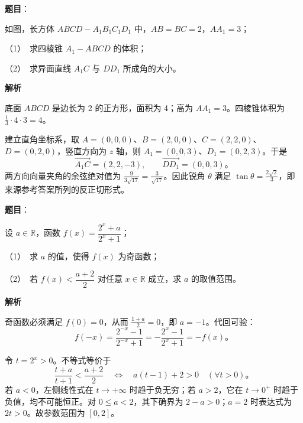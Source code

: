 \begin{answer}

\textbf{题目}：

如图，长方体 $ABCD-A_1B_1C_1D_1$ 中，$AB=BC=2$，$AA_1=3$；
\nopagebreak[4]
\begin{center}\end{center}
\nopagebreak[4]
（1）　求四棱锥 $A_1-ABCD$ 的体积；

（2）　求异面直线 $A_1C$ 与 $DD_1$ 所成角的大小。

\textbf{解析}


底面 $ABCD$ 是边长为 2 的正方形，面积为 4；高为 $AA_1=3$。四棱锥体积为 $\frac13\cdot4\cdot3=4$。


建立直角坐标系，取 $A=(0,0,0)$、$B=(2,0,0)$、$C=(2,2,0)$、$D=(0,2,0)$，竖直方向为 $z$ 轴，则 $A_1=(0,0,3)$、$D_1=(0,2,3)$。于是
\nopagebreak[4]
\[
\overrightarrow{A_1C}=(2,2,-3),\qquad
\overrightarrow{DD_1}=(0,0,3)\text{。}
\]
两方向向量夹角的余弦绝对值为 $\frac9{3\sqrt{17}}=\frac3{\sqrt{17}}$。因此锐角 $\theta$ 满足 $\tan\theta=\frac{2\sqrt2}{3}$，即来源参考答案所列的反正切形式。



\end{answer}
\begin{answer}

\textbf{题目}：

设 $a\in\mathbb R$，函数 $f(x)=\dfrac{2^x+a}{2^x+1}$；

（1）　求 $a$ 的值，使得 $f(x)$ 为奇函数；

（2）　若 $f(x)<\dfrac{a+2}{2}$ 对任意 $x\in\mathbb R$ 成立，求 $a$ 的取值范围。

\textbf{解析}


奇函数必须满足 $f(0)=0$，从而 $\frac{1+a}{2}=0$，即 $a=-1$。代回可验：
\nopagebreak[4]
\[
f(-x)=\frac{2^{-x}-1}{2^{-x}+1}
=-\frac{2^x-1}{2^x+1}=-f(x)\text{。}
\]


令 $t=2^x>0$。不等式等价于
\nopagebreak[4]
\[
\frac{t+a}{t+1}<\frac{a+2}{2}
\quad\Longleftrightarrow\quad a(t-1)+2>0\quad(\forall t>0)\text{。}
\]
若 $a<0$，左侧线性式在 $t\to+\infty$ 时趋于负无穷；若 $a>2$，它在 $t\to0^+$ 时趋于负值，均不可能恒正。对 $0\le a<2$，其下确界为 $2-a>0$；$a=2$ 时表达式为 $2t>0$。故参数范围为 $[0,2]$。



\end{answer}
